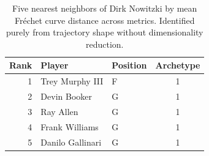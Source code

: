 \begin{table}[htbp]
  \centering\small
  \begin{tabular}{rllc}
    \toprule
    Rank & Player & Position & Archetype \\
    \midrule
    1 & Trey Murphy III & F & 1 \\
    2 & Devin Booker & G & 1 \\
    3 & Ray Allen & G & 1 \\
    4 & Frank Williams & G & 1 \\
    5 & Danilo Gallinari & G & 1 \\
    \bottomrule
  \end{tabular}
  \caption{Five nearest neighbors of Dirk Nowitzki by mean Fr\'{e}chet curve distance across metrics. Identified purely from trajectory shape without dimensionality reduction.}
  \label{tab:Dirk_Nowitzki_frechet_curve_neighbors}
\end{table}

